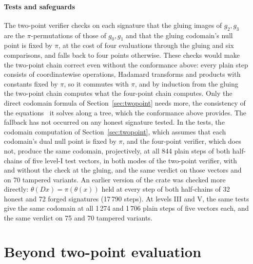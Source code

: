 \documentclass[version=preprint]{iacrcc}
\begin{document}
    \paragraph{Tests and safeguards}
    The two-point verifier checks on each signature that the gluing images of
    $g_2, g_3$ are the $\pi$-permutations of those of $g_0, g_1$ and that the
    gluing codomain's null point is fixed by $\pi$, at the cost of four
    evaluations through the gluing and six comparisons, and falls back to four
    points otherwise. These checks would make the two-point chain correct even
    without the conformance above: every plain step consists of coordinatewise
    operations, Hadamard transforms and products with constants fixed by $\pi$,
    so it commutes with $\pi$, and by induction from the gluing the two-point
    chain computes what the four-point chain computes. Only the direct codomain
    formula of Section~\ref{sec:twopoint} needs more, the consistency of the
    equations~\cite[Eq.~(21)]{Dar24} it solves along a tree, which the
    conformance above provides. The
    fallback has not occurred on any honest signature tested. In the tests, the
    codomain computation of Section~\ref{sec:twopoint}, which assumes that each
    codomain's dual null point is fixed by $\pi$, and the four-point verifier,
    which does not, produce the same codomain, projectively, at all 844
    plain steps of both half-chains of five level-I test vectors, in both
    modes of the two-point verifier, with and without the check at the gluing, and the same
    verdict on those vectors and on 70 tampered variants. An earlier version of
    the crate was checked more directly: $\theta(Dx) = \pi(\theta(x))$ held at
    every step of both half-chains of 32 honest and 72 forged signatures
    (17\,790 steps). At levels III and V, the same tests give the same codomain at all
    1\,274 and 1\,706 plain steps of five vectors each, and the same verdict on 75 and 70 tampered variants.

    \section{Beyond two-point evaluation}
    \label{app:beyond}
\end{document}
